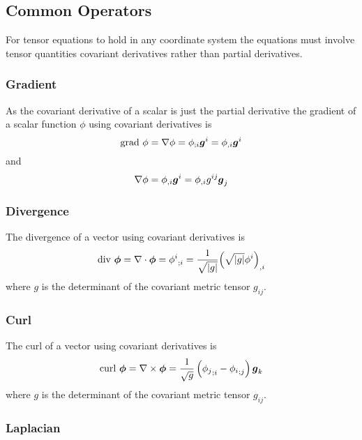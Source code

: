 \subsection{Common Operators}
For tensor equations to hold in any coordinate system the equations must
involve tensor quantities \ie covariant derivatives rather than partial derivatives.

\subsubsection{Gradient}

As the covariant derivative of a scalar is just the partial derivative the
gradient of a scalar function $\phi$ using covariant derivatives is
\begin{equation}
  \text{grad } \phi = \gradient{}{\phi}=\covarderiv{\phi}{i}\vectr{g}^{i}=\partialderiv{\phi}{i}\vectr{g}^{i}
\end{equation}
and
\begin{equation}
  \gradient{}{\phi}=\partialderiv{\phi}{i}\vectr{g}^{i}=\partialderiv{\phi}{i}g^{ij}\vectr{g}_{j}
\end{equation}

\subsubsection{Divergence}

The divergence of a vector using covariant derivatives is
\begin{equation}
  \text{div } \vectr{\phi} = \divergence{}{\vectr{\phi}}=\covarderiv{\phi^{i}}{i}=\frac{1}{\sqrt{\abs{g}}}\partialderiv{\pbrac{\sqrt{\abs{g}}\phi^{i}}}{i}
\end{equation}
where $g$ is the determinant of the covariant metric tensor $g_{ij}$.

\subsubsection{Curl}

The curl of a vector using covariant derivatives is
\begin{equation}
  \text{curl } \vectr{\phi} = \curl{}{\vectr{\phi}}=\frac{1}{\sqrt{g}}\pbrac{\covarderiv{\phi_{j}}{i}-\covarderiv{\phi_{i}}{j}}\vectr{g}_{k}
\end{equation}
where $g$ is the determinant of the covariant metric tensor $g_{ij}$.

\subsubsection{Laplacian}

